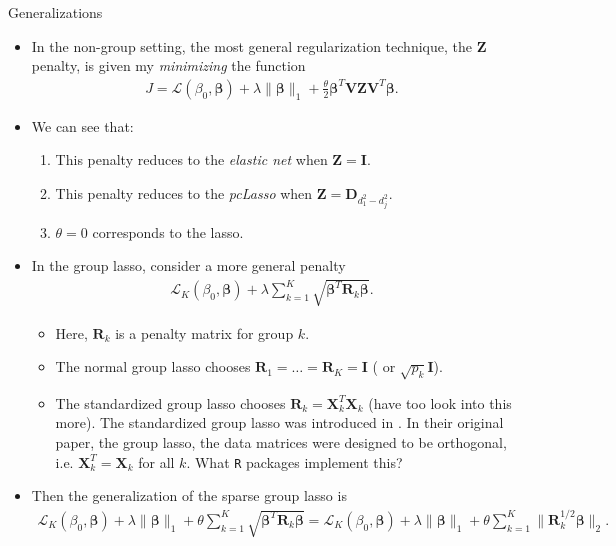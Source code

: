 \documentclass[8pt]{beamer}
\begin{document}
\begin{frame}{Generalizations}
\begin{itemize}
    \item In the non-group setting, the most general regularization technique, the $\mathbf{Z}$ penalty, is given my \textit{minimizing} the function 
    \begin{align*}
        J = \mathcal{L}(\beta_0, \bm{\beta}) + \lambda \| \bm{\beta} \|_1 + \frac{\theta}{2} \bm{\beta}^T \mathbf{V} \mathbf{Z} \mathbf{V}^T \bm{\beta}.
    \end{align*}
    \item We can see that:
    \begin{enumerate}
        \item This penalty reduces to the \textit{elastic net} when $\mathbf{Z} = \mathbf{I}$.
        \item This penalty reduces to the \textit{pcLasso} when $\mathbf{Z} = \mathbf{D}_{d_1^2 - d_j^2}$.
        \item $\theta = 0$ corresponds to the lasso. 
    \end{enumerate}

    \item In the group lasso, \cite{yuan2006model} consider a more general penalty 
    \begin{align*}
        \mathcal{L}_K(\beta_0, \bm{\beta}) + \lambda \sum_{k=1}^K \sqrt{\bm{\beta}^T \mathbf{R}_k \bm{\beta}}.
    \end{align*}
    \begin{itemize}
        \item Here, $\mathbf{R}_k$ is a penalty matrix for group $k$.
        \item The normal group lasso chooses $\mathbf{R}_1 = \ldots = \mathbf{R}_K = \mathbf{I}$ ( or $\sqrt{p_k} \mathbf{I}$).
        \item The standardized group lasso chooses $\mathbf{R}_k = \mathbf{X}_k^T \mathbf{X}_k$ (have too look into this more). The standardized group lasso was introduced in \cite{simon2012standardization}. In their original paper, the group lasso, the data matrices were designed to be orthogonal, i.e. $\mathbf{X}_k^T = \mathbf{X}_k$ for all $k$. What \texttt{R} packages implement this?
    \end{itemize}
    \item Then the generalization of the sparse group lasso is 
    \begin{align*}
        \mathcal{L}_K(\beta_0, \bm{\beta}) + \lambda \| \bm{\beta} \|_1 + \theta \sum_{k=1}^K \sqrt{\bm{\beta}^T \mathbf{R}_k \bm{\beta}} = \mathcal{L}_K(\beta_0, \bm{\beta}) + \lambda \| \bm{\beta} \|_1 + \theta \sum_{k=1}^K \| \mathbf{R}_k^{1/2} \bm{\beta} \|_2.
    \end{align*}
\end{itemize}
    
\end{frame}
\end{document}
